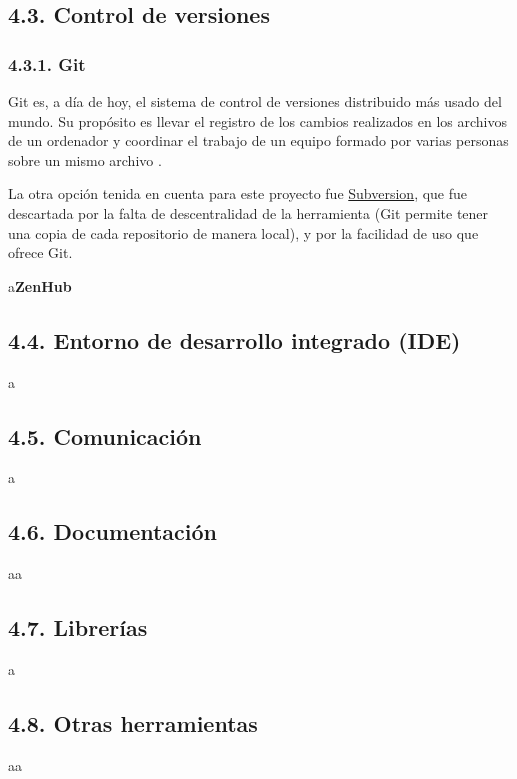 \subsection{4.3. Control de versiones}

\subsubsection{4.3.1. Git}

Git es, a día de hoy, el sistema de control de versiones distribuido más usado del mundo. Su propósito es llevar el registro de los cambios realizados en los archivos de un ordenador y coordinar el trabajo de un equipo formado por varias personas sobre un mismo archivo \cite{wiki:Git}.

La otra opción tenida en cuenta para este proyecto fue \href{https://subversion.apache.org/}{Subversion}, que fue descartada por la falta de descentralidad de la herramienta (Git permite tener una copia de cada repositorio de manera local), y por la facilidad de uso que ofrece Git.

a\textbf{ZenHub}

\subsection{4.4. Entorno de desarrollo integrado (IDE)}

a

\subsection{4.5. Comunicación}

a

\subsection{4.6. Documentación}

aa

\subsection{4.7. Librerías}

a

\subsection{4.8. Otras herramientas}

aa